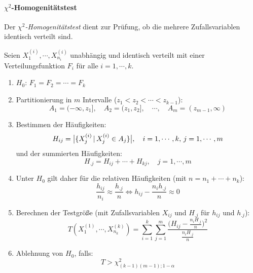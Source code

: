         \paragraph{\(\chi^2\)-Homogenitätstest}
            Der \textit{\(\chi^2\)-Homogenitätstest} dient zur Prüfung, ob die mehrere Zufallsvariablen identisch verteilt sind.
            
            Seien \( X_1^{(i)}, \cdots, X_{n_i}^{(i)} \) unabhängig und identisch verteilt mit einer Verteilungsfunktion \(F_i\) für alle \( i = 1, \cdots, k \).
            \begin{enumerate}
            	\item \(H_0\): \quad \( F_1 = F_2 = \cdots = F_k \)
            	\item Partitionierung in \(m\) Intervalle (\( z_1 < z_2 < \cdots < z_{k-1} \)):
                	\begin{equation*}
	                	A_1 = (-\infty, z_1], \quad A_2 = (z_1, z_2], \quad \cdots, \quad A_m = (z_{m-1}, \infty)
                	\end{equation*}
                \item Bestimmen der Häufigkeiten:
	                \begin{equation*}
		                H_{ij} = \big| \{ X_j^{(i)} \,\vert\, X_j^{(i)} \in A_j \} \big|, \quad i = 1, \cdots, k,\, j = 1, \cdots, m
	                \end{equation*}
	                und der summierten Häufigkeiten:
	                \begin{equation*}
		                H_{.j} = H_{ij} + \cdots + H_{kj}, \quad j = 1, \cdots, m
	                \end{equation*}
	            \item Unter \(H_0\) gilt daher für die relativen Häufigkeiten (mit \( n = n_1 + \cdots + n_k \)):
		            \begin{equation*}
			            \frac{h_{ij}}{n_i} \approx \frac{h_{.j}}{n} \iff h_{ij} - \frac{n_i h_{.j}}{n} \approx 0
		            \end{equation*}
		        \item Berechnen der Testgröße (mit Zufallsvariablen \(X_{ij}\) und \(H_{.j}\) für \(h_{ij}\) und \(h_{.j}\)):
			        \begin{equation*}
				        T(X_1^{(1)}, \cdots, X_{n_k}^{(k)}) = \sum_{i=1}^{k} \sum_{j=1}^m \frac{\Big(H_{ij} - \frac{n_i H_{.j}}{n}\Big)^2}{\frac{n_i H_{.j}}{n}}
			        \end{equation*}
			    \item Ablehnung von \(H_0\), falls:
				    \begin{equation*}
					    T > \chi_{(k-1)(m-1); 1-\alpha}^2
				    \end{equation*}
            \end{enumerate}

